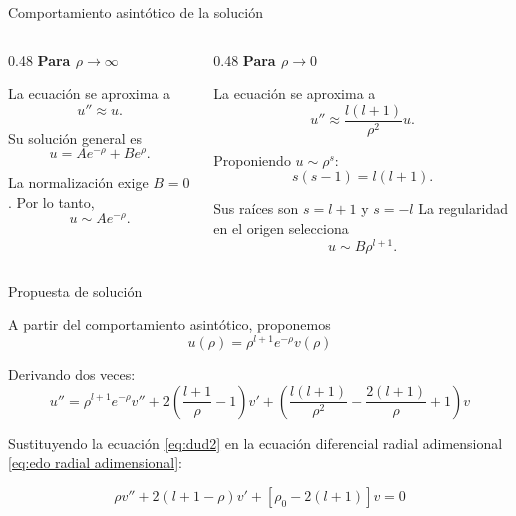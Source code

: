 \begin{frame}{Comportamiento asintótico de la solución}

    \begin{columns}[T]

        \begin{column}{0.48\textwidth}
            \textbf{Para $\rho\rightarrow\infty$}

            La ecuación se aproxima a
            \[
                u''\approx u.
            \]

            Su solución general es
            \[
                u=Ae^{-\rho}+Be^\rho.
            \]

            La normalización exige $B=0$. Por lo tanto,
            \[
                u\sim Ae^{-\rho}.
            \]
        \end{column}

        \begin{column}{0.48\textwidth}
            \textbf{Para $\rho\rightarrow0$}

            La ecuación se aproxima a
            \[
                u''\approx
                \frac{l(l+1)}{\rho^2}u.
            \]

            Proponiendo $u\sim\rho^s$:
            \[
                s(s-1)=l(l+1).
            \]

            Sus raíces son $s=l+1$ y $s=-l$
            La regularidad en el origen selecciona
            \[
                u\sim B\rho^{l+1}.
            \]
        \end{column}
    \end{columns}
\end{frame}

\begin{frame}{Propuesta de solución}

    A partir del comportamiento asintótico, proponemos
    \[
        u(\rho)=\rho^{l+1}e^{-\rho}v(\rho)
    \]

    Derivando dos veces:
    \begin{equation}
        u''={}\rho^{l+1}e^{-\rho}v''+2\left(\frac{l+1}{\rho}-1\right)v'+
        \left(
            \frac{l(l+1)}{\rho^2}
            -\frac{2(l+1)}{\rho}+1
        \right)v
        \label{eq:dud2}
    \end{equation}

    Sustituyendo la ecuación \ref{eq:dud2} en la ecuación diferencial radial adimensional \ref{eq:edo radial adimensional}:
    
    \begin{equation}
        \rho v''+2(l+1-\rho)v'+[\rho_0-2(l+1)]v=0
    \end{equation}
\end{frame}

